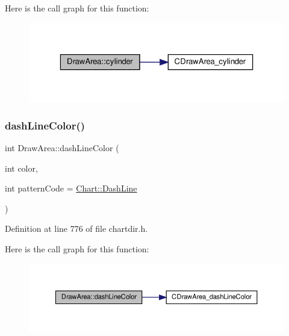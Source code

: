 Here is the call graph for this function\+:
\nopagebreak
\begin{figure}[H]
\begin{center}
\leavevmode
\includegraphics[width=323pt]{class_draw_area_a0d8b5c5958f9b5bb43b19eea323a1bdb_cgraph}
\end{center}
\end{figure}
\mbox{\label{class_draw_area_a88bee0a5a20595187bb9c93c240deda7}} 
\subsubsection{\texorpdfstring{dash\+Line\+Color()}{dashLineColor()}}
{\footnotesize\ttfamily int Draw\+Area\+::dash\+Line\+Color (\begin{DoxyParamCaption}\item[{int}]{color,  }\item[{int}]{pattern\+Code = {\ttfamily \hyperlink{namespace_chart_a5ae3d159f02ffed01fcc4e63793dea7da11e22a06cf50415c9f8c799ce6ecd671}{Chart\+::\+Dash\+Line}} }\end{DoxyParamCaption})\hspace{0.3cm}{\ttfamily [inline]}}



Definition at line 776 of file chartdir.\+h.

Here is the call graph for this function\+:
\nopagebreak
\begin{figure}[H]
\begin{center}
\leavevmode
\includegraphics[width=350pt]{class_draw_area_a88bee0a5a20595187bb9c93c240deda7_cgraph}
\end{center}
\end{figure}
\mbox{\label{class_draw_area_a5419d2c91a119d416d79d16f7025d4e4}} 
